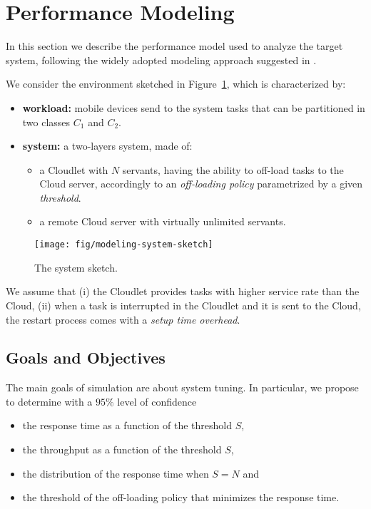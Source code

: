 \section{Performance Modeling}
\label{sec:modeling}

In this section we describe the performance model used to analyze the target system, following the widely adopted modeling approach suggested in \cite{leemis2006discrete}.


We consider the environment sketched in Figure~\ref{fig:modeling-system-sketch}, which is characterized by:

\begin{itemize}
	\item  \textbf{workload:} mobile devices send to the system tasks that can be partitioned in two classes $C_{1}$ and $C_{2}$.
	\item \textbf{system:} a two-layers system, made of:	
	\begin{itemize}
		\item a Cloudlet with $N$ servants, having the ability to off-load tasks to the Cloud server, accordingly to an \textit{off-loading policy} parametrized by a given \textit{threshold}.
		\item a remote Cloud server with virtually unlimited servants.
		
	\end{itemize}
\end{itemize}

\begin{figure}
	\texttt{[image: fig/modeling-system-sketch]}
	\caption{The system sketch.}
	\label{fig:modeling-system-sketch}
\end{figure}

We assume that
(i) the Cloudlet provides tasks with higher service rate than the Cloud, 
(ii) when a task is interrupted in the Cloudlet and it is sent to the Cloud, the restart process comes with a \textit{setup time overhead}.

\subsection{Goals and Objectives}
The main goals of simulation are about system tuning.
In particular, we propose to determine with a $95\%$ level of confidence
\begin{itemize}
	\item the response time as a function of the threshold $S$,
	\item the throughput as a function of the threshold $S$,
	\item the distribution of the response time when $S=N$ and
	\item the threshold of the off-loading policy that minimizes the response time.
\end{itemize}


